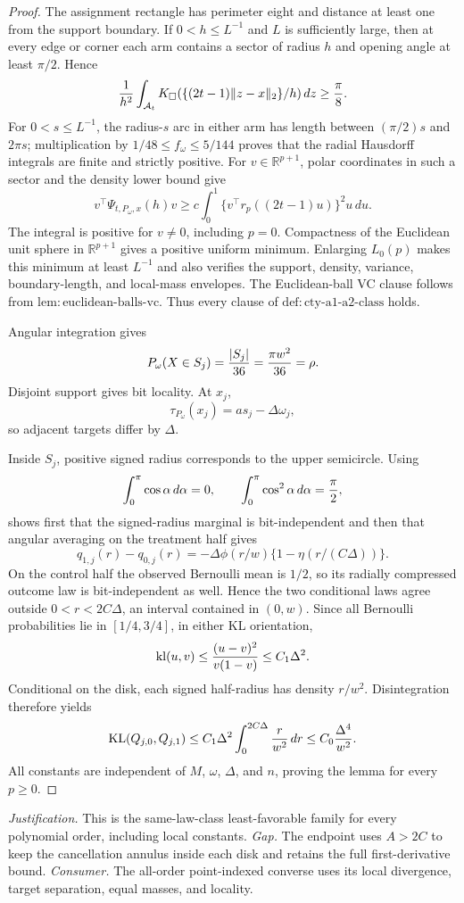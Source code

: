 \documentclass{article}
\begin{document}
\begin{proof}
The assignment rectangle has perimeter eight and distance at least one from the support boundary.  If \(0<h\leq L^{-1}\) and \(L\) is sufficiently large, then at every edge or corner each arm contains a sector of radius \(h\) and opening angle at least \(\pi/2\).  Hence
\[
 {1\over h^2}\int_{\mathcal A_t}
 K_\square(\{(2t-1)\|z-x\|_2\}/h)\,dz\geq{\pi\over8}.
\]
For \(0<s\leq L^{-1}\), the radius-\(s\) arc in either arm has length between \((\pi/2)s\) and \(2\pi s\); multiplication by \(1/48\leq f_\omega\leq5/144\) proves that the radial Hausdorff integrals are finite and strictly positive.  For \(v\in\mathbb R^{p+1}\), polar coordinates in such a sector and the density lower bound give
\[
 v^\top\Psi_{t,P_\omega,x}(h)v
 \geq c\int_0^1\{v^\top r_p((2t-1)u)\}^2u\,du.
\]
The integral is positive for \(v\ne0\), including \(p=0\).  Compactness of the Euclidean unit sphere in \(\mathbb R^{p+1}\) gives a positive uniform minimum.  Enlarging \(L_0(p)\) makes this minimum at least \(L^{-1}\) and also verifies the support, density, variance, boundary-length, and local-mass envelopes.  The Euclidean-ball VC clause follows from \(\mathrm{lem:euclidean\text{-}balls\text{-}vc}\).  Thus every clause of \(\mathrm{def:cty\text{-}a1\text{-}a2\text{-}class}\) holds.

Angular integration gives
\[
 P_\omega(X\in S_j)={|S_j|\over36}={\pi w^2\over36}=\rho.
\]
Disjoint support gives bit locality.  At \(x_j\),
\[
 \tau_{P_\omega}(x_j)=as_j-\Delta\omega_j,
\]
so adjacent targets differ by \(\Delta\).

Inside \(S_j\), positive signed radius corresponds to the upper semicircle.  Using
\[
 \int_0^\pi\cos\alpha\,d\alpha=0,
 \qquad \int_0^\pi\cos^2\alpha\,d\alpha={\pi\over2},
\]
shows first that the signed-radius marginal is bit-independent and then that angular averaging on the treatment half gives
\[
 q_{1,j}(r)-q_{0,j}(r)
 =-\Delta\phi(r/w)\{1-\eta(r/(C\Delta))\}.
\]
On the control half the observed Bernoulli mean is \(1/2\), so its radially compressed outcome law is bit-independent as well.  Hence the two conditional laws agree outside \(0<r<2C\Delta\), an interval contained in \((0,w)\).  Since all Bernoulli probabilities lie in \([1/4,3/4]\), in either KL orientation,
\[
 \operatorname{kl}(u,v)\leq{(u-v)^2\over v(1-v)}
 \leq C_1\Delta^2.
\]
Conditional on the disk, each signed half-radius has density \(r/w^2\).  Disintegration therefore yields
\[
 \operatorname{KL}(Q_{j,0},Q_{j,1})
 \leq C_1\Delta^2\int_0^{2C\Delta}{r\over w^2}\,dr
 \leq C_0{\Delta^4\over w^2}.
\]
All constants are independent of \(M\), \(\omega\), \(\Delta\), and \(n\), proving the lemma for every \(p\geq0\).
\end{proof}
\par\smallskip\noindent \textit{Justification.} This is the same-law-class least-favorable family for every polynomial order, including local constants. \textit{Gap.} The endpoint uses \(A>2C\) to keep the cancellation annulus inside each disk and retains the full first-derivative bound. \textit{Consumer.} The all-order point-indexed converse uses its local divergence, target separation, equal masses, and locality.
\end{document}

